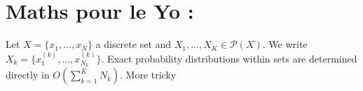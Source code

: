 \documentclass[11pt]{article}
\begin{document}
\section*{Maths pour le Yo :}

Let $X = \{x_1,\ldots ,x_N\}$ a discrete set and $X_1,\ldots ,X_K \in \mathcal{P}(X)$. We write $X_k = \{x_1^{(k)},\ldots ,x_{N_k}^{(k)}\}$. Exact probability distributions within sets are determined directly in $O(\sum_{k=1}^{K}{N_k})$. More tricky
\end{document}
